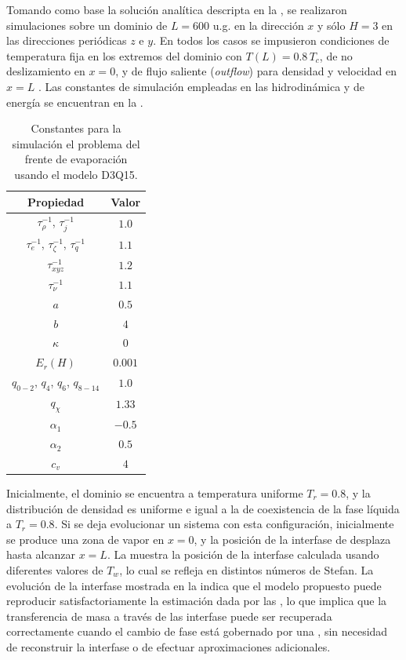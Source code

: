 Tomando como base la soluci\'on anal\'itica descripta en la , se realizaron simulaciones sobre un dominio de $L=600$ u.g. en la direcci\'on $x$ y s\'olo $H=3$ en las direcciones peri\'odicas $z$ e $y$. En todos los casos se impusieron condiciones de temperatura fija en los extremos del dominio con $T(L) = 0.8 \, T_c$, de no deslizamiento en $x=0$, y de flujo saliente (\emph{outflow}) para densidad y velocidad en $x=L$ \cite{lou_evaluation_2013}. Las constantes de simulaci\'on empleadas en las \lbe{} hidrodin\'amica y de energ\'ia se encuentran en la . 

\begin{table}[ht]
	\centering
    \begin{tabular}{c c}
	    \toprule
        \bf Propiedad & \bf Valor \\
        \midrule
        $\tau_{\rho}^{-1}$, $\tau_{j}^{-1}$ & $1.0$ \\
        $\tau_{e}^{-1}$, $\tau_{\zeta}^{-1}$, $\tau_{q}^{-1}$ & $1.1$ \\
        $\tau_{xyz}^{-1}$ & $1.2$ \\
        $\tau_{\nu}^{-1}$ & $1.1$ \\
		$a$ & $0.5$ \\
		$b$ & $4$ \\
		$\kappa$   & 0 \\
		$E_r (H)$  & $0.001$ \\
		$q_{0-2}$, $q_4$, $q_{6}$, $q_{8-14}$ & $1.0$ \\
		$q_{\chi}$ & $1.33$ \\
		$\alpha_1$ & $-0.5$ \\
		$\alpha_2$ & $0.5$ \\
		$c_v$      & $4$ \\
        \bottomrule
	\end{tabular}
	\caption{Constantes para la simulaci\'on el problema del frente de evaporaci\'on usando el modelo D3Q15.}
	\label{tab:stefan3D_prop}
\end{table} 

Inicialmente, el dominio se encuentra a temperatura uniforme $T_r = 0.8$, y la distribuci\'on de densidad es uniforme e igual a la de coexistencia de la fase l\'iquida a $T_r = 0.8$. Si se deja evolucionar un sistema con esta configuraci\'on, inicialmente se produce una zona de vapor en $x=0$, y la posici\'on de la interfase de desplaza hasta alcanzar $x=L$. La  muestra la posici\'on de la interfase calculada usando diferentes valores de $T_w$, lo cual se refleja en distintos n\'umeros de Stefan. La evoluci\'on de la interfase mostrada en la  indica que el modelo propuesto puede reproducir satisfactoriamente la estimaci\'on dada por las , lo que implica que la transferencia de masa a trav\'es de las interfase puede ser recuperada correctamente cuando el cambio de fase est\'a gobernado por una \eos{}, sin necesidad de reconstruir la interfase o de efectuar aproximaciones adicionales.

